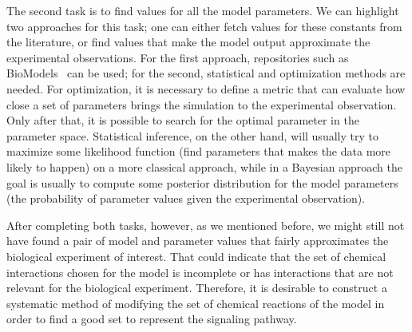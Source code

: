 The second task is to find values for all the model parameters. We can
highlight two approaches for this task; one can either fetch values for 
these constants from the literature, or find values that make 
the model output approximate the experimental observations. For the
first approach, repositories such as BioModels~\cite{le2006biomodels} 
can be used; for the second, statistical and optimization
methods are needed. For optimization, it is necessary to define a metric
that can evaluate how close a set of parameters brings the simulation to 
the experimental observation. Only after that, it is possible to search 
for the optimal parameter in the parameter space. Statistical inference, 
on the other hand, will usually try to maximize some likelihood function 
(find parameters that makes the data more likely to happen) on a more 
classical approach, while in a Bayesian approach the goal is usually to
compute some posterior distribution for the model parameters (the 
probability of parameter values given the experimental observation).


After completing both tasks, however, as we mentioned before, we might 
still not have found a pair of model and parameter values that fairly 
approximates the biological experiment of interest. That could indicate 
that the set of chemical interactions chosen for the model is 
incomplete or has interactions that are not relevant for the biological 
experiment. Therefore, it is desirable to construct a systematic method 
of modifying the set of chemical reactions of the model in order to 
find a good set to represent the signaling pathway.

